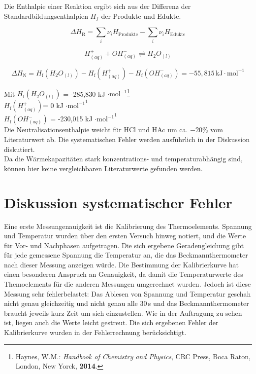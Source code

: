 \documentclass[12pt,a4paper,titlepage,headinclude,bibtotoc]{scrartcl}
\begin{document}
Die Enthalpie einer Reaktion ergibt sich aus der Differenz der Standardbildungsenthalpien $H_f$ der Produkte und Edukte.

\begin{equation}
\Delta H_\mathrm{R}= \sum_i \nu_i H_\mathrm{Produkte}- \sum_i \nu_i H_\mathrm{Edukte}
\end{equation}

\begin{equation}
H^+_{(aq)} + OH^-_{(aq)} \rightleftharpoons H_2O_{(l)}
\end{equation}

\begin{equation}
\Delta H_\mathrm{N}= H_\mathrm{f}(H_2O_{(l)}) -H_\mathrm{f}(H^+_{(aq)}) -H_\mathrm{f}(OH^-_{(aq)}) = -55,815\, \mathrm{kJ}\cdot \mathrm{mol}^{-1}
\end{equation}

Mit $H_\mathrm{f}(H_2O_{(l)})$ = -285,830 kJ $\cdot \mathrm{mol}^{-1}$\footnote{Haynes, W.M.: \emph{Handbook of Chemistry and Physics}, CRC Press, Boca Raton, London, New Yorck, \textbf{2014}.}\\
$H_\mathrm{f}(H^+_{(aq)})$= 0 kJ $\cdot {\mathrm{mol}^{-1}}^1$\\
$H_\mathrm{f}(OH^-_{(aq)})$ = -230,015 kJ $\cdot {\mathrm{mol}^{-1}}^1$\\

Die Neutralisationsenthalpie weicht für HCl und HAc um ca. $-20\%$ vom Literaturwert ab. 
Die systematischen Fehler werden ausführlich in der Diskussion diskutiert.\\

Da die Wärmekapazitäten stark konzentrations- und temperaturabhängig sind, können hier keine vergleichbaren Literaturwerte gefunden werden.\\

\newpage
\section{Diskussion systematischer Fehler}
Eine erste Messungenauigkeit ist die Kalibrierung des Thermoelements. Spannung und Temperatur wurden über den ersten Versuch hinweg notiert, und die Werte für Vor- und Nachphasen aufgetragen. Die sich ergebene Geradengleichung gibt für jede gemessene Spannung die Temperatur an, die das Beckmannthermometer nach dieser Messung anzeigen würde. Die Bestimmung der Kalibrierkurve hat einen besonderen Anspruch an Genauigkeit, da damit die Temperaturwerte des Themoelements für die anderen Messungen umgerechnet wurden. Jedoch ist diese Messung sehr fehlerbelastet: Das Ablesen von Spannung und Temperatur geschah nicht genau gleichzeitig und nicht genau alle 30\,s und das Beckmannthermometer braucht jeweils kurz Zeit um sich einzustellen. Wie in der Auftragung zu sehen ist, liegen auch die Werte leicht gestreut. Die sich ergebenen Fehler der Kalibrierkurve wurden in der Fehlerrechnung berücksichtigt.\\
\end{document}
